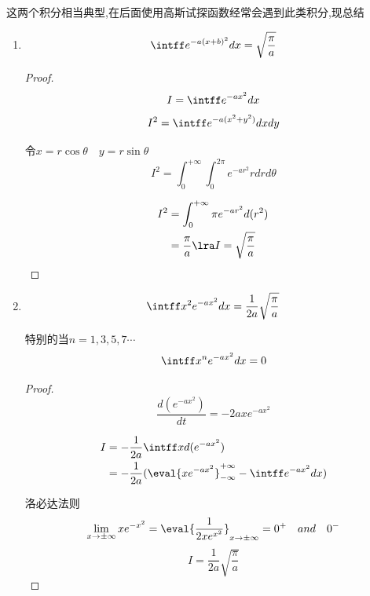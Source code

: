         
        \begin{formal}
        这两个积分相当典型,在后面使用高斯试探函数经常会遇到此类积分,现总结
        

        \begin{enumerate}
            \item 
                $$ \intff e^{-a (x+b)^{2}} dx = \sqrt{\frac{\pi}{a}} $$
            \begin{proof}
                \pfindent 

                $$I=\intff e^{-a x^{2}} dx$$
                $$I^{2}= \intff e^{-a (x^{2}+y^{2})} dx dy $$

                令$x=r\cos{\theta} \quad y=r\sin{\theta}$
                $$ I^{2} = \int_{0}^{+\infty} \int_{0}^{2\pi} e^{-a r^{2}} rdrd\theta $$
               
                \begin{align*}
                    I^{2} &= \int_{0}^{+\infty} \pi  e^{-a r^{2}}d(r^{2})   \\
                          &= \frac{\pi}{a}  \lra I = \sqrt{\frac{\pi}{a}} 
                \end{align*}
            
            \end{proof}

            \item 
                $$ \intff x^{2} e^{-a x^{2}} dx = \frac{1}{2a} \sqrt{\frac{\pi}{a}} $$

                特别的当$n=1,3,5,7\cdots$
                $$ \intff x^{n} e^{-a x^{2}} dx = 0 $$

                \begin{proof}
                    \pfindent
                    $$ \frac{d(e^{-a x^{2}})}{dt} = -2a x e^{-a x^{2}} $$
                    
                    \begin{align*}
                        I &= -\frac{1}{2a} \intff x d(e^{-a x^{2}})                                         \\
                          &= -\frac{1}{2a} (\eval{x e^{-a x^{2}}}_{-\infty}^{+\infty} - \intff e^{-a x^{2}}dx )
                    \end{align*}

                    洛必达法则
                    $$ \lim_{x \to \pm \infty} x e^{-x^{2}} = \eval{\frac{1}{2x e^{x^{2}}}}_{x \to \pm \infty} = 0^{+} \quad and \quad 0^{-} $$ 
                    $$ I = \frac{1}{2a} \sqrt{\frac{\pi}{a}}$$


\end{proof}
\end{enumerate}
\end{formal}

